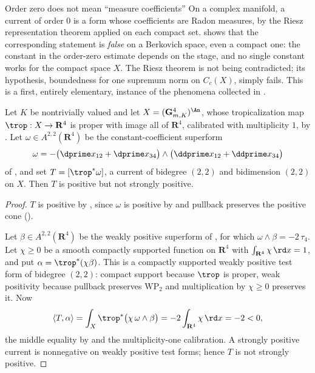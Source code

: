 \begin{warning}{Order zero does not mean ``measure coefficients''}
On a complex manifold, a current of order $0$ is a form whose coefficients
are Radon measures, by the Riesz representation theorem applied on each
compact set.   shows that the corresponding
statement is \emph{false} on a Berkovich space, even a compact one: the
constant in the order-zero estimate depends on the stage, and no single
constant works for the compact space $X$.  The Riesz theorem is not being
contradicted; its hypothesis, boundedness for one supremum norm on
$C_c(X)$, simply fails.  This is a first, entirely elementary, instance of
the phenomena collected in .
\end{warning}

\begin{example}
\label{ex:ch14-positive-not-strong-current}
Let $K$ be nontrivially valued and let $X=(\mathbf G_{m,K}^4)^{\An}$, whose
tropicalization map $\trop:X\to\mathbf R^4$ is proper with image all of
$\mathbf R^4$, calibrated with multiplicity $1$, by
.  Let $\omega\in A^{2,2}(\mathbf R^4)$ be the
constant-coefficient superform
\[
 \omega=-\bigl(\dprime x_{12}+\dprime x_{34}\bigr)
        \wedge\bigl(\ddprime x_{12}+\ddprime x_{34}\bigr)
\]
of , and set
$T=[\trop^*\omega]$, a current of bidegree $(2,2)$ and bidimension $(2,2)$
on $X$.  Then $T$ is positive but not strongly positive.
\end{example}

\begin{proof}
$T$ is positive by , since $\omega$ is
positive by  and pullback preserves the
positive cone ().

Let $\beta\in A^{2,2}(\mathbf R^4)$ be the weakly positive superform of
, for which
$\omega\wedge\beta=-2\,\tau_4$.  Let $\chi\ge0$ be a smooth compactly
supported function on $\mathbf R^4$ with $\int_{\mathbf R^4}\chi\,\rd x=1$,
and put $\alpha=\trop^*(\chi\beta)$.  This is a compactly supported
weakly positive test form of bidegree $(2,2)$: compact support because
$\trop$ is proper, weak positivity because pullback preserves
$\mathrm{WP}_2$ and multiplication by $\chi\ge0$ preserves it.  Now
\[
 \langle T,\alpha\rangle
 =\int_X\trop^*\bigl(\chi\,\omega\wedge\beta\bigr)
 =-2\int_{\mathbf R^4}\chi\,\rd x=-2<0,
\]
the middle equality by  and the
multiplicity-one calibration.  A strongly positive current is nonnegative on
weakly positive test forms; hence $T$ is not strongly positive.
\end{proof}

